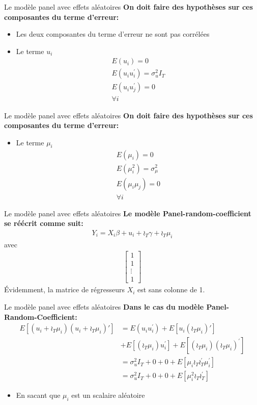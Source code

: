 \documentclass{beamer}
\begin{document}
\begin{frame}{Le modèle panel avec effets aléatoires}
\textbf{On doit faire des hypothèses sur ces composantes du terme d’erreur:}
\begin{itemize}
\item Les deux composantes du terme d’erreur ne sont pas corrélées 
\item Le terme $u_{i}$
\begin{align*}
E(u_i)=0 \\
E(u_iu_i^{'})=\sigma_u^2I_T\\
E(u_iu_j^{'})=0 \\
\forall i
\end{align*}
\end{itemize}
\end{frame}

\begin{frame}{Le modèle panel avec effets aléatoires}
\textbf{On doit faire des hypothèses sur ces composantes du terme d’erreur:}
\begin{itemize}
\item Le terme $\mu_{i}$
\begin{align*}
E(\mu_i)=0 \\
E(\mu_i^2)=\sigma_{\mu}^2\\
E(\mu_i \mu_j)=0 \\
\forall i
\end{align*}
\end{itemize}
\end{frame}


\begin{frame}{Le modèle panel avec effets aléatoires}
\textbf{Le modèle Panel-random-coefficient se réécrit comme suit:}
\begin{align*}
Y_i=X_i \beta+u_i+\wr_T \gamma +\wr_T \mu_i
\end{align*}
avec 
\begin{align*}
\begin{bmatrix} 
1 \\
1 \\
\vdots \\
1
\end{bmatrix}
\end{align*}
Évidemment, la matrice de régresseurs $X_i$ est sans colonne de 1.
\end{frame}

\begin{frame}{Le modèle panel avec effets aléatoires}
\textbf{Dans le cas du modèle Panel-Random-Coefficient:}
\begin{align*}
E[(u_i+\wr_T\mu_i)(u_i+\wr_T \mu_i)']
& = E(u_iu_i^{'})+E[u_i(\wr_T\mu_{i})'] \\ &+E[(\wr_T\mu_{i})u_i^{'}]+E[(\wr_T\mu_i)(\wr_T\mu_i)^{'}] \\ &
=\sigma_u^2 I_T +0+0+E[\mu_i \wr_T\wr_T^{'}\mu_{i}^{'}] \\ &
=\sigma_u^2 I_T+0+0+E[\mu_i^2 \wr_T\wr_T^{'}]
\end{align*}
\begin{itemize}
\item En sacant que $\mu_i$ est un scalaire aléatoire

\end{itemize}
\end{frame}
\end{document}
